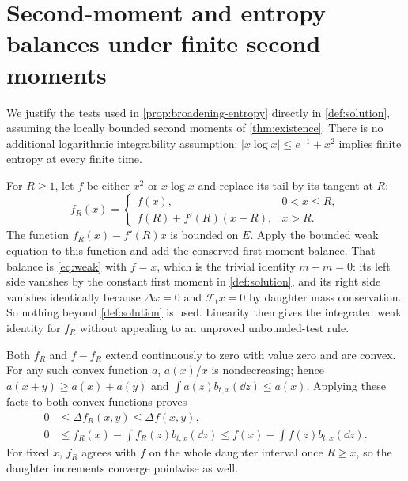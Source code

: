 \section{Second-moment and entropy balances under finite second moments}
\label{app:unbounded}

We justify the tests used in \cref{prop:broadening-entropy} directly in
\cref{def:solution}, assuming the locally bounded second moments of
\cref{thm:existence}. There is no additional logarithmic integrability
assumption: $|x\log x|\leq e^{-1}+x^2$ implies finite entropy at every
finite time.

For $R\geq1$, let $f$ be either $x^2$ or $x\log x$ and replace its tail
by its tangent at $R$:
\begin{equation}
 f_R(x)=
 \begin{cases}
 f(x),&0<x\leq R,\\
 f(R)+f'(R)(x-R),&x>R.
 \end{cases}
 \label{eq:tangent-truncation}
\end{equation}
The function $f_R(x)-f'(R)x$ is bounded on $E$. Apply the bounded weak
equation to this function and add the conserved first-moment balance.
That balance is \eqref{eq:weak} with $f=x$, which is the trivial identity
$m-m=0$: its left side vanishes by the constant first moment in
\cref{def:solution}, and its right side vanishes identically because
$\Delta x=0$ and $\mathcal F_tx=0$ by daughter mass conservation. So
nothing beyond \cref{def:solution} is used. Linearity then gives the
integrated weak identity for $f_R$ without appealing to an unproved
unbounded-test rule.

Both $f_R$ and $f-f_R$ extend continuously to zero with value zero and are
convex. For any such convex function $a$, $a(x)/x$ is nondecreasing; hence
$a(x+y)\geq a(x)+a(y)$ and
$\int a(z)b_{t,x}(\dd z)\leq a(x)$. Applying these facts to both convex
functions proves
\begin{align}
 0&\leq\Delta f_R(x,y)\leq\Delta f(x,y),\label{eq:tangent-coag-dom}\\
 0&\leq f_R(x)-\int f_R(z)b_{t,x}(\dd z)
 \leq f(x)-\int f(z)b_{t,x}(\dd z).\label{eq:tangent-frag-dom}
\end{align}
For fixed $x$, $f_R$ agrees with $f$ on the whole daughter interval once
$R\geq x$, so the daughter increments converge pointwise as well.

